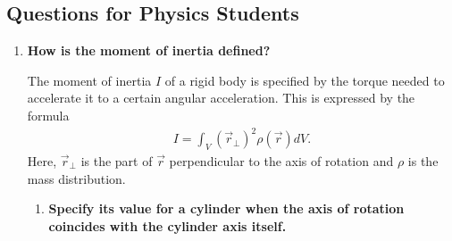 \subsection{Questions for Physics Students}
\begin{enumerate}
	\item \textbf{How is the moment of inertia defined?}
	
	The moment of inertia $I$ of a rigid body is specified by the torque needed to accelerate it to a certain angular acceleration. This is expressed by the formula
	\begin{align}
		I = \int_{V} (\vec{r}_\perp)^2 \rho (\vec{r}) dV.
		\label{eq::inertia}
	\end{align}
	Here, $\vec{r}_\perp$ is the part of $\vec{r}$ perpendicular to the axis of rotation and $\rho$ is the mass distribution.
	
	\begin{enumerate}
		\item 
		\textbf{Specify its value for a cylinder when the axis of rotation coincides with the cylinder axis itself.}
		
		
	\end{enumerate}
\end{enumerate}